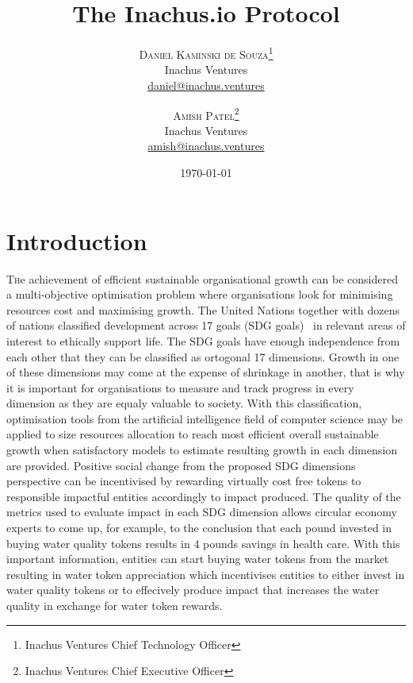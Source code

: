\documentclass[twoside,twocolumn]{article}
\title{The Inachus.io Protocol} %
\author{
  \textsc{Daniel Kaminski de Souza}\thanks{Inachus Ventures Chief Technology Officer} \\[1ex] %
  \normalsize Inachus Ventures \\ %
  \normalsize \href{mailto:daniel@inachus.ventures}{daniel@inachus.ventures} %
  \and %
  \textsc{Amish Patel}\thanks{Inachus Ventures Chief Executive Officer} \\[1ex] %
  \normalsize Inachus Ventures \\ %
  \normalsize \href{mailto:amish@inachus.ventures}{amish@inachus.ventures} %
}
\date{\today} %
\begin{document}
\maketitle


\section{Introduction}

\lettrine[nindent=0em,lines=3]{T} he achievement of efficient sustainable organisational growth can be considered a multi-objective optimisation problem where organisations look for minimising resources cost and maximising growth. The United Nations together with dozens of nations classified development across 17 goals (SDG goals)~\cite{the_17_sdg_goals} in relevant areas of interest to ethically support life. The SDG goals have enough independence from each other that they can be classified as ortogonal 17 dimensions. Growth in one of these dimensions may come at the expense of shrinkage in another, that is why it is important for organisations to measure and track progress in every dimension as they are equaly valuable to society. With this classification, optimisation tools from the artificial intelligence field of computer science may be applied to size resources allocation to reach most efficient overall sustainable growth when satisfactory models to estimate resulting growth in each dimension are provided. Positive social change from the proposed SDG dimensions perspective can be incentivised by rewarding virtually cost free tokens to responsible impactful entities accordingly to impact produced. The quality of the metrics used to evaluate impact in each SDG dimension allows circular economy experts to come up, for example, to the conclusion that each pound invested in buying water quality tokens results in 4 pounds savings in health care. With this important information, entities can start buying water tokens from the market resulting in water token appreciation which incentivises entities to either invest in water quality tokens or to effecively produce impact that increases the water quality in exchange for water token rewards.



\end{document}
